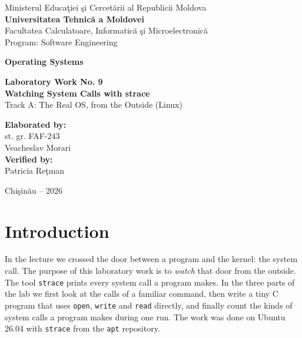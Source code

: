 \documentclass[12pt,a4paper]{article}
\begin{document}
\begin{titlepage}
    \centering
    Ministerul Educa\c{t}iei \c{s}i Cercet\u{a}rii al Republicii Moldova\\[0.4cm]
    \textbf{Universitatea Tehnic\u{a} a Moldovei}\\[0.4cm]
    Facultatea Calculatoare, Informatic\u{a} \c{s}i Microelectronic\u{a}\\[0.2cm]
    Program: Software Engineering

    \vspace{3cm}

    {\LARGE \textbf{Operating Systems}}

    \vspace{1.2cm}

    {\Large \textbf{Laboratory Work No. 9}}\\[0.6cm]
    {\LARGE \textbf{Watching System Calls with strace}}\\[0.3cm]
    Track A: The Real OS, from the Outside (Linux)

    \vspace{3cm}

    \begin{flushright}
        \textbf{Elaborated by:}\\
        st. gr. FAF-243\\
        Veacheslav Morari\\[0.6cm]
        \textbf{Verified by:}\\
        Patricia Re\c{t}man
    \end{flushright}

    \vfill
    Chi\c{s}in\u{a}u -- 2026
\end{titlepage}

\tableofcontents
\newpage

\section*{Introduction}

In the lecture we crossed the door between a program and the kernel: the system call. The purpose of this laboratory work is to \emph{watch} that door from the outside. The tool \texttt{strace} prints every system call a program makes. In the three parts of the lab we first look at the calls of a familiar command, then write a tiny C program that uses \texttt{open}, \texttt{write} and \texttt{read} directly, and finally count the kinds of system calls a program makes during one run. The work was done on Ubuntu 26.04 with \texttt{strace} from the \texttt{apt} repository.
\end{document}

